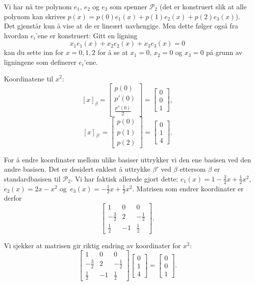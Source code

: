 \begin{losning}
\begin{punkt}
\noindent
Vi har nå tre polynom $e_1$, $e_2$ og $e_3$ som spenner $\mathcal{P}_2$ (det er konstruert slik at alle polynom kan skrives $p(x)=p(0)e_1(x)+p(1)e_2(x)+p(2)e_3(x)$). Det gjenstår kun å vise at de er lineært uavhengige. Men dette følger også fra hvordan $e_i$'ene er konstruert: Gitt en ligning $$x_1e_1(x)+x_2e_2(x)+x_3e_3(x)=0$$ kan du sette inn for $x=0,1,2$ for å se at $x_1=0$, $x_2=0$ og $x_3=0$ på grunn av ligningene som definerer $e_i$'ene.
\end{punkt}

\begin{punkt}
Koordinatene til $x^2$: $$[x]_\beta=\begin{bmatrix}
p(0)\\
p'(0)\\
\frac{p''(0)}{2}
\end{bmatrix}=\begin{bmatrix}
0\\
0\\
1
\end{bmatrix},$$ $$[x]_{\beta'}=\begin{bmatrix}
p(0)\\
p(1)\\
p(2)
\end{bmatrix}=\begin{bmatrix}
0\\
1\\
4
\end{bmatrix}.$$
\end{punkt}

\begin{punkt}
For å endre koordinater mellom ulike basiser uttrykker vi den ene basisen ved den andre basisen. Det er desidert enklest å uttrykke $\beta '$ ved $\beta$ ettersom $\beta$ er standardbasisen til $\mathcal{P}_2$. Vi har faktisk allerede gjort dette: $e_1(x)=1-\frac{3}{2}x+\frac{1}{2}x^2$, $e_2(x)=2x-x^2$ og~$e_3(x)=-\frac{1}{2}x+\frac{1}{2}x^2$. Matrisen som endrer koordinater er derfor
$$
\begin{bmatrix}
1 & 0 & 0\\
-\frac{3}{2} & 2 & -\frac{1}{2}\\
\frac{1}{2} & -1 & \frac{1}{2}
\end{bmatrix}.$$

\noindent
Vi sjekker at matrisen gir riktig endring av koordinater for $x^2$:
$$
\begin{bmatrix}
1 & 0 & 0\\
-\frac{3}{2} & 2 & -\frac{1}{2}\\
\frac{1}{2} & -1 & \frac{1}{2}
\end{bmatrix}\begin{bmatrix}
0\\
1\\
4
\end{bmatrix}=\begin{bmatrix}
0\\
0\\
1
\end{bmatrix}.$$

\end{punkt}

\end{losning}




